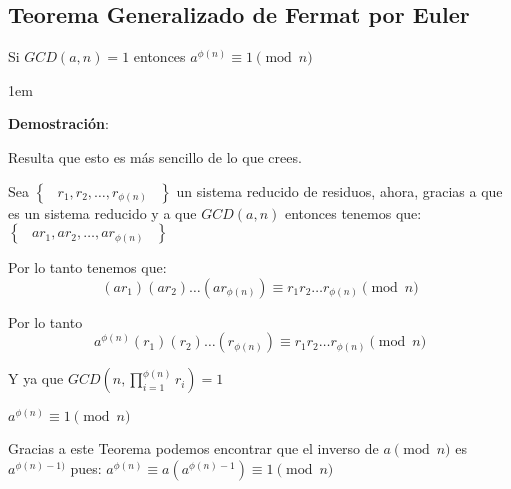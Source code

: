 \documentclass[12pt, fleqn]{report}                             %
\newenvironment{SmallIndentation}[1][0.75em]                    %
    {\begin{adjustwidth}{#1}{}\begin{footnotesize}}                 %
    {\end{footnotesize}\end{adjustwidth}}                           %
\DeclareMathOperator \Space {\quad}                             %
\DeclareMathOperator \MiniSpace {\;}                            %
\newcommand{\Set}[1]{\left\{ \MiniSpace #1 \MiniSpace \right\}} %
\begin{document}
        \clearpage
        \subsection{Teorema Generalizado de Fermat por Euler}


            Si $GCD(a, n) = 1$ entonces $a^{\phi(n)} \equiv 1 \pmod{n}$

            \begin{SmallIndentation}[1em]
                \textbf{Demostración}:

                Resulta que esto es más sencillo de lo que crees.

                Sea $\Set{r_1, r_2, \dots, r_{\phi(n)}}$ un sistema reducido
                de residuos, ahora, gracias a que es un sistema reducido y a 
                que $GCD(a, n)$ entonces tenemos que:
                $\Set{ar_1, ar_2, \dots, ar_{\phi(n)}}$

                Por lo tanto tenemos que:
                \begin{equation*}
                    (ar_1)(ar_2)\dots(ar_{\phi(n)})
                    \equiv
                    r_1 r_2 \dots r_{\phi(n)} \pmod{n}
                \end{equation*}

                Por lo tanto
                \begin{equation*}
                    a^{\phi(n)}(r_1)(r_2)\dots(r_{\phi(n)})
                    \equiv
                    r_1 r_2 \dots r_{\phi(n)} \pmod{n}
                \end{equation*}

                Y ya que $GCD(n, \prod_{i=1}^{\phi(n)} r_i) = 1$

                $a^{\phi(n)} \equiv 1 \pmod{n}$

            \end{SmallIndentation} 


            Gracias a este Teorema podemos encontrar que el inverso de
            $a \pmod{n}$ es $a^{\phi(n) -1)}$ pues:
            $a^{\phi(n)} \equiv a(a^{\phi(n)-1}) \equiv 1 \pmod{n}$        



        \clearpage
\end{document}
